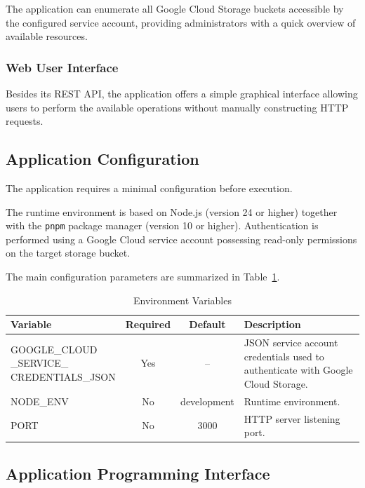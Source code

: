 The application can enumerate all Google Cloud Storage buckets accessible by the configured service account, providing administrators with a quick overview of available resources.

\subsubsection{Web User Interface}

Besides its REST API, the application offers a simple graphical interface allowing users to perform the available operations without manually constructing HTTP requests.

\subsection{Application Configuration}

The application requires a minimal configuration before execution.

The runtime environment is based on Node.js (version 24 or higher) together with the \texttt{pnpm} package manager (version 10 or higher). Authentication is performed using a Google Cloud service account possessing read-only permissions on the target storage bucket.

The main configuration parameters are summarized in Table~\ref{tab:gcs-env}.

\begin{table}[H]
\centering
\caption{Environment Variables}
\label{tab:gcs-env}
\begin{tabular}{|l|c|c|p{6cm}|}
\hline
\textbf{Variable} & \textbf{Required} & \textbf{Default} & \textbf{Description} \\
\hline
\makecell{GOOGLE\_CLOUD\\\_SERVICE\_\\CREDENTIALS\_JSON} & Yes & -- & JSON service account credentials used to authenticate with Google Cloud Storage. \\
\hline
NODE\_ENV & No & development & Runtime environment. \\
\hline
PORT & No & 3000 & HTTP server listening port. \\
\hline
\end{tabular}
\end{table}

\subsection{Application Programming Interface}

